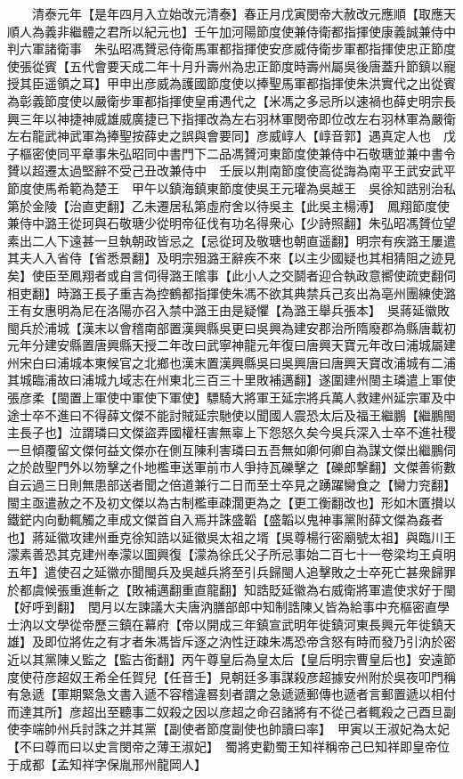 　　清泰元年【是年四月入立始改元清泰】春正月戊寅閔帝大赦改元應順【取應天順人為義非繼體之君所以紀元也】壬午加河陽節度使兼侍衛都指揮使康義誠兼侍中判六軍諸衛事　朱弘昭馮贇忌侍衛馬軍都指揮使安彦威侍衛步軍都指揮使忠正節度使張從賓【五代會要天成二年十月升壽州為忠正節度時壽州屬吳後唐蓋升節鎮以寵授其臣遥領之耳】甲申出彦威為護國節度使以捧聖馬軍都指揮使朱洪實代之出從賓為彰義節度使以嚴衛步軍都指揮使皇甫遇代之【米馮之多忌所以速禍也薛史明宗長興三年以神捷神威雄威廣捷已下指揮改為左右羽林軍閔帝即位改左右羽林軍為嚴衛左右龍武神武軍為捧聖按薛史之誤與會要同】彦威崞人【崞音郭】遇真定人也　戊子樞密使同平章事朱弘昭同中書門下二品馮贇河東節度使兼侍中石敬瑭並兼中書令贇以超遷太過堅辭不受己丑改兼侍中　壬辰以荆南節度使高從誨為南平王武安武平節度使馬希範為楚王　甲午以鎮海鎮東節度使吳王元瓘為吳越王　吳徐知誥别治私第於金陵【治直吏翻】乙未遷居私第虛府舍以待吳主【此吳主楊溥】　鳳翔節度使兼侍中潞王從珂與石敬瑭少從明帝征伐有功名得衆心【少詩照翻】朱弘昭馮贇位望素出二人下遠甚一旦執朝政皆忌之【忌從珂及敬瑭也朝直遥翻】明宗有疾潞王屢遣其夫人入省侍【省悉景翻】及明宗殂潞王辭疾不來【以主少國疑也其相猜阻之迹見矣】使臣至鳳翔者或自言伺得潞王隂事【此小人之交鬬者迎合執政意嚮使疏吏翻伺相吏翻】時潞王長子重吉為控鶴都指揮使朱馮不欲其典禁兵己亥出為亳州團練使潞王有女惠明為尼在洛陽亦召入禁中潞王由是疑懼【為潞王舉兵張本】　吳蔣延徽敗閩兵於浦城【漢末以會稽南部置漢興縣吳更曰吳興為建安郡治所隋廢郡為縣唐載初元年分建安縣置唐興縣天授二年改曰武寧神龍元年復曰唐興天寶元年改曰浦城屬建州宋白曰浦城本東候官之北鄉也漢末置漢興縣吳曰吳興唐曰唐興天寶改浦城有二浦其城臨浦故曰浦城九域志在州東北三百三十里敗補邁翻】遂圍建州閩主璘遣上軍使張彦柔【閩置上軍使中軍使下軍使】驃騎大將軍王延宗將兵萬人救建州延宗軍及中途士卒不進曰不得薛文傑不能討賊延宗馳使以聞國人震恐太后及福王繼鵬【繼鵬閩主長子也】泣謂璘曰文傑盜弄國權枉害無辜上下怨怒久矣今吳兵深入士卒不進社稷一旦傾覆留文傑何益文傑亦在側互陳利害璘曰五吾無如卿何卿自為謀文傑出繼鵬伺之於啟聖門外以笏擊之仆地檻車送軍前市人爭持瓦礫擊之【礫郎撃翻】文傑善術數自云過三日則無患部送者聞之倍道兼行二日而至士卒見之踴躍臠食之【臠力兖翻】閩主亟遣赦之不及初文傑以為古制檻車疎濶更為之【更工衡翻改也】形如木匱攅以鐵鋩内向動輒觸之車成文傑首自入焉并誅盛韜【盛韜以鬼神事黨附薛文傑為姦者也】蔣延徽攻建州垂克徐知誥以延徽吳太祖之壻【吳尊楊行密廟號太祖】與臨川王濛素善恐其克建州奉濛以圖興復【濛為徐氏父子所忌事始二百七十一卷梁均王貞明五年】遣使召之延徽亦聞閩兵及吳越兵將至引兵歸閩人追擊敗之士卒死亡甚衆歸罪於都虞候張重進斬之【敗補邁翻重直龍翻】知誥貶延徽為右威衛將軍遣使求好于閩【好呼到翻】　閏月以左諫議大夫唐汭膳部郎中知制誥陳乂皆為給事中充樞密直學士汭以文學從帝歷三鎮在幕府【帝以開成三年鎮宣武明年徙鎮河東長興元年徙鎮天雄】及即位將佐之有才者朱馮皆斥逐之汭性迂疎朱馮恐帝含怒有時而發乃引汭於密近以其黨陳乂監之【監古銜翻】丙午尊皇后為皇太后【皇后明宗曹皇后也】安遠節度使苻彦超奴王希全任賀兒【任音壬】見朝廷多事謀殺彦超據安州附於吳夜叩門稱有急遞【軍期緊急文書入遞不容稽違晷刻者謂之急遞遞郵傳也遞者言郵置遞以相付而達其所】彦超出至聽事二奴殺之因以彦超之命召諸將有不從己者輒殺之己酉旦副使李端帥州兵討誅之并其黨【副使者節度副使也帥讀曰率】　甲寅以王淑妃為太妃【不曰尊而曰以史言閔帝之薄王淑妃】　蜀將吏勸蜀王知祥稱帝己巳知祥即皇帝位于成都【孟知祥字保胤邢州龍岡人】

